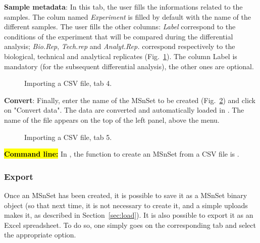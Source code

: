 \documentclass[12pt]{article}
\begin{document}
\textbf {Sample metadata}: In this tab, the user fills the informations related to the samples. The colum named \emph{Experiment} is filled by default with the name of the different samples. The user fills the other columns: \emph{Label} correspond to the conditions of the experiment that will be compared during the differential analysis; \emph{Bio.Rep}, \emph{Tech.rep} and \emph{Analyt.Rep.} correspond respectively to the biological, technical and analytical replicates (Fig.~\ref{fig:imp4}). The column Label is mandatory (for the subsequent differential analysis), the other ones are optional.
\begin {figure}
\centering
{}
\caption{Importing a CSV file, tab 4.}\label{fig:imp4}
\end {figure}

\textbf {Convert}: Finally, enter the name of the MSnSet to be created (Fig.~\ref{fig:imp5}) and click on "Convert data". The data are converted and automatically loaded in . The name of the file appears on the top of the left panel, above the menu.
\begin {figure}
\centering
{}
\caption{Importing a CSV file, tab 5.}\label{fig:imp5}
\end {figure}


\hl{\bf Command line:} In , the function to create an MSnSet from a CSV file is .


\subsubsection{Export}
Once an MSnSet has been created, it is possible to save it as a MSnSet binary object (so that next time, it is not necessary to create it, and a simple uploads makes it, as described in Section~\ref{sec:load}). It is also possible to export it as an Excel spreadsheet. To do so, one simply goes on the corresponding tab and select the appropriate option.
\end{document}
